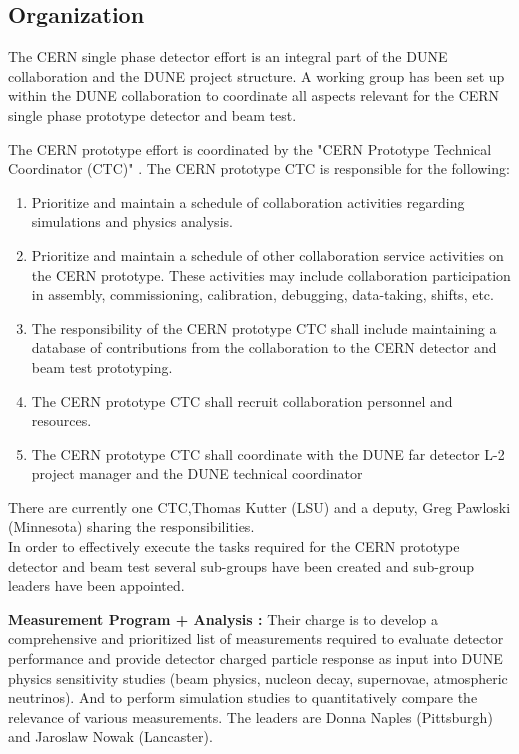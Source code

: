 \subsection{Organization}

The CERN single phase detector effort is an integral part of the DUNE collaboration and the DUNE project structure. 
A working group has been set up within the DUNE collaboration to coordinate all aspects relevant for the CERN single phase prototype detector and beam test. 

The CERN prototype effort is coordinated by the "CERN Prototype Technical Coordinator (CTC)" \cite{LBNEorg}.
The CERN prototype CTC is responsible for the following:
\begin{enumerate}[i]
	\item Prioritize and maintain a schedule of collaboration activities regarding simulations and physics analysis. 
	\item Prioritize and maintain a schedule of other collaboration service activities on the CERN prototype.  These activities may include collaboration participation in assembly, commissioning, calibration, debugging, data-taking, shifts, etc. 
	\item The responsibility of the CERN prototype CTC shall include maintaining a database of contributions from the collaboration to the CERN detector and beam test prototyping.
	\item The CERN prototype CTC shall recruit collaboration personnel and resources.
	\item The CERN prototype CTC shall coordinate with the DUNE far detector L-2 project manager and the DUNE technical coordinator
\end{enumerate}
There are currently one CTC,Thomas Kutter (LSU)  and a deputy, Greg Pawloski (Minnesota) sharing the responsibilities.\\
 

In order to effectively execute the tasks required for the CERN prototype detector and beam test several sub-groups have been created 
and sub-group leaders have been appointed.

{\bf Measurement Program + Analysis :}   Their charge is to develop a comprehensive and prioritized list of measurements required to evaluate detector performance and provide detector charged particle response as input into DUNE physics sensitivity studies (beam physics, nucleon decay, supernovae, atmospheric neutrinos).  And to perform simulation studies to quantitatively compare the relevance of various measurements.
The leaders are Donna Naples (Pittsburgh) and Jaroslaw Nowak (Lancaster).
 
